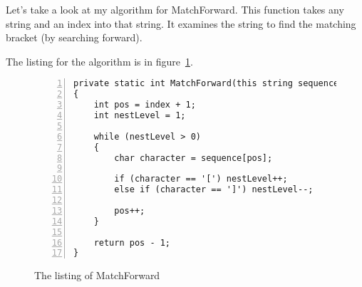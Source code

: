 \documentclass[10pt]{amsart}
\begin{document}
Let's take a look at my algorithm for MatchForward. This function
takes any string and an index into that string.
It examines the string to find the matching bracket (by searching forward).

The listing for the algorithm is in figure~\ref{fig:jumpforward}.

\begin{figure}
\caption{The listing of MatchForward}
\label{fig:jumpforward}
\begin{lstlisting}[numbers=left]
private static int MatchForward(this string sequence, int index)
{
    int pos = index + 1;
    int nestLevel = 1;

    while (nestLevel > 0)
    {
        char character = sequence[pos];

        if (character == '[') nestLevel++;
        else if (character == ']') nestLevel--;

        pos++;
    }

    return pos - 1;
}
\end{lstlisting}
\end{figure}
\end{document}
